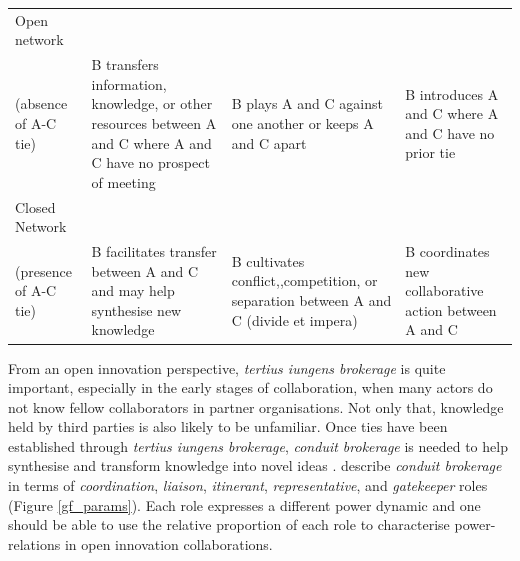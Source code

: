 \begin{table}[]
\begin{tabularx}{\textwidth}{p{3.5cm}p{3.5cm}p{3.5cm}p{3.5cm}}
	Open network\\(absence of A-C tie) & B transfers information, knowledge, or other resources between A and C where A and C have no prospect of meeting & B plays A and C against one another or keeps A and C apart & B introduces A and C where A and C have no prior tie \\ \midrule
	Closed Network\\(presence of A-C tie) & B facilitates transfer between A and C and may help synthesise new knowledge & B cultivates conflict,,competition, or separation between A and C (divide et impera) & B coordinates new collaborative action between A and C \\ \bottomrule
\end{tabularx}
\end{table}

From an open innovation perspective, \emph{tertius iungens brokerage} is quite important, especially in the early stages of collaboration, when many actors do not know fellow collaborators in partner organisations. Not only that, knowledge held by third parties is also likely to be unfamiliar. Once ties have been established through \emph{tertius iungens brokerage}, \emph{conduit brokerage} is needed to help synthesise and transform knowledge into novel ideas \citep{fleming2007collaborative,lingo2010nexus,quintane2016brokers}. \citet{gould1989structures} describe \emph{conduit brokerage} in terms of \emph{coordination}, \emph{liaison}, \emph{itinerant}, \emph{representative}, and \emph{gatekeeper} roles (Figure \ref{gf_params}). Each role expresses a different power dynamic and one should be able to use the relative proportion of each role to characterise power-relations in open innovation collaborations. \medskip

